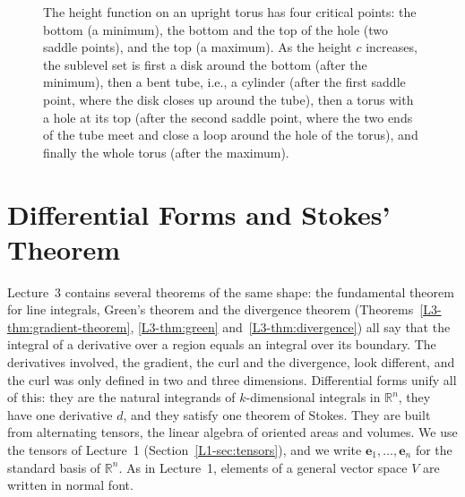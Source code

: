 \begin{figure}[ht]
    \centering
    \caption{The height function on an upright torus has four critical points: the bottom (a minimum), the bottom and the top of the hole (two saddle points), and the top (a maximum). As the height $c$ increases, the sublevel set is first a disk around the bottom (after the minimum), then a bent tube, i.e., a cylinder (after the first saddle point, where the disk closes up around the tube), then a torus with a hole at its top (after the second saddle point, where the two ends of the tube meet and close a loop around the hole of the torus), and finally the whole torus (after the maximum).}
    \label{A-fig:torus}
\end{figure}

\section{Differential Forms and Stokes' Theorem}\label{A-sec:forms}

Lecture~3 contains several theorems of the same shape: the fundamental theorem for line integrals, Green's theorem and the divergence theorem (Theorems~\ref{L3-thm:gradient-theorem}, \ref{L3-thm:green} and~\ref{L3-thm:divergence}) all say that the integral of a derivative over a region equals an integral over its boundary. The derivatives involved, the gradient, the curl and the divergence, look different, and the curl was only defined in two and three dimensions. Differential forms unify all of this: they are the natural integrands of $k$-dimensional integrals in $\mathbb{R}^n$, they have one derivative $d$, and they satisfy one theorem of Stokes. They are built from alternating tensors, the linear algebra of oriented areas and volumes. We use the tensors of Lecture~1 (Section~\ref{L1-sec:tensors}), and we write $\mathbf{e}_1, \ldots, \mathbf{e}_n$ for the standard basis of $\mathbb{R}^n$. As in Lecture~1, elements of a general vector space $V$ are written in normal font.

